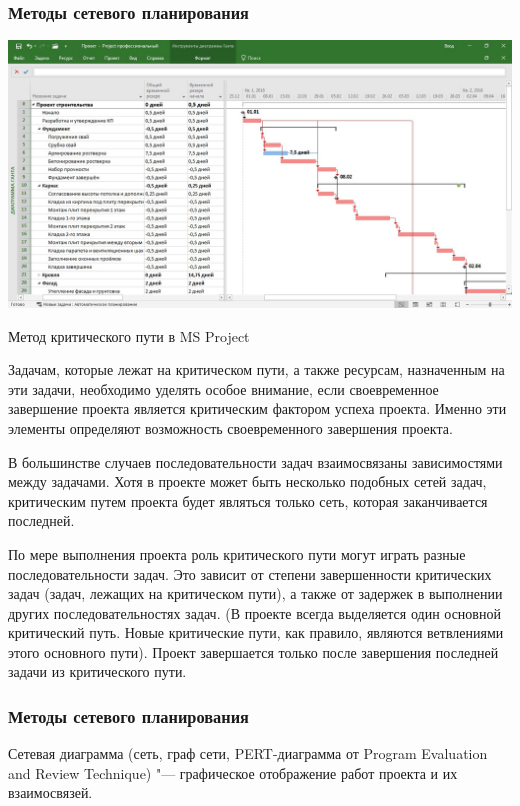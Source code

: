 \documentclass{../industrial-development}
\begin{document}
    \begin{frame} \frametitle{Методы сетевого планирования}
         \centerline{\includegraphics[width=1\textwidth]{critical.jpg}}
	\centerline{Метод  критического пути в MS Project}	
    \end{frame}
    \lecturenotes

Задачам, которые лежат на критическом пути, а также ресурсам, назначенным на эти задачи, необходимо уделять особое внимание, если своевременное завершение проекта является критическим фактором успеха проекта. Именно эти элементы определяют возможность своевременного завершения проекта.

В большинстве случаев последовательности задач взаимосвязаны зависимостями между задачами. Хотя в проекте может быть несколько подобных сетей задач, критическим путем проекта будет являться только сеть, которая заканчивается последней.

По мере выполнения проекта роль критического пути могут играть разные последовательности задач. Это зависит от степени завершенности критических задач (задач, лежащих на критическом пути), а также от задержек в выполнении других последовательностях задач. (В проекте всегда выделяется один основной критический путь. Новые критические пути, как правило, являются ветвлениями этого основного пути). Проект завершается только после завершения последней задачи из критического пути.

    \begin{frame} \frametitle{Методы сетевого планирования}
        \begin{definition}
         Сетевая диаграмма (сеть, граф сети, PERT-диаграмма от Program Evaluation and Review Technique) "--- графическое отображение работ проекта и их взаимосвязей.
        \end{definition}
    \end{frame}
    \lecturenotes 
\end{document}
